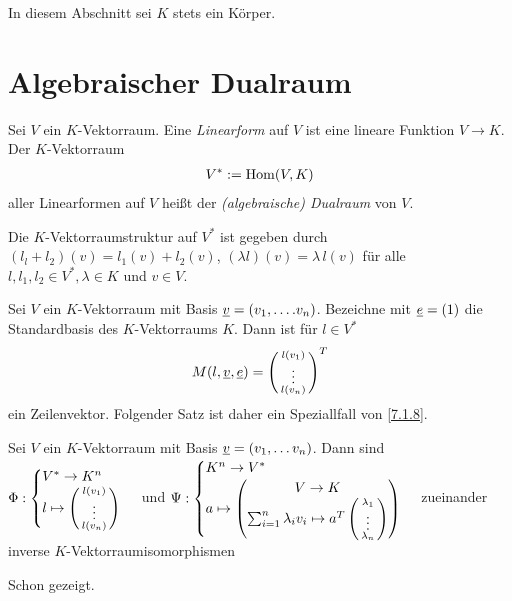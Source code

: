 \documentclass[../../main.tex]{subfiles}
\begin{document}
In diesem Abschnitt sei $K$ stets ein Körper.

\section{Algebraischer Dualraum}

\begin{df}\label{13.1.1} 
Sei $V$ ein $K$-Vektorraum. Eine \emph{Linearform} auf $V$ ist eine lineare Funktion $V\to K$. Der $K$-Vektorraum
\begin{align*}
V^*:=\operatorname{Hom}(V,K)
\end{align*}
aller Linearformen auf $V$ heißt der \emph{(algebraische) Dualraum} von $V$.
\end{df} 

\begin{er}\label{13.1.2}
Die $K$-Vektorraumstruktur auf $V^*$ ist gegeben durch
$(l_l+l_2)(v)=l_1(v)+l_2(v)$, $(\lambda l)(v)=\lambda\,l(v)$ für alle $l,l_1,l_2\in V^*, \lambda\in K$ und $v\in V$.
\end{er}

\begin{bem}\label{13.1.3}
Sei $V$ ein $K$-Vektorraum mit Basis ${\underline v}=(v_1,\ldots .v_n)$. Bezeichne mit ${\underline e}=(1)$ die Standardbasis des $K$-Vektorraums $K$.  Dann ist für $l\in V^*$
\begin{align*}
M(l,\underline{v},\underline{e})=\left(\begin{smallmatrix}l(v_1)\\\vdots\\l(v_n)\end{smallmatrix}\right)^T
\end{align*}
ein Zeilenvektor. Folgender Satz ist daher ein Speziallfall von \ref{7.1.8}.
\end{bem}

\begin{sat}\label{13.1.4}
Sei $V$ ein $K$-Vektorraum mit Basis ${\underline v}=(v_1,\ldots v_n)$. Dann sind $\Phi: \begin{cases}V^*\to K^n\\l\mapsto \left(\begin{smallmatrix}l(v_1)\\\vdots\\l(v_n)\end{smallmatrix}\right)\end{cases}$ und $\Psi: \begin{cases}K^n\to V^*\\ a\mapsto\begin{pmatrix*}V\to K\\\sum_{i=1}^n\lambda_iv_i\mapsto a^T\cvec{\lambda_1\\\vdots\\\lambda_n}\end{pmatrix*}\end{cases}$ zueinander inverse $K$-Vektorraumisomorphismen
\end{sat}
\begin{cproof} Schon gezeigt.
\end{cproof}
	
\end{document}
